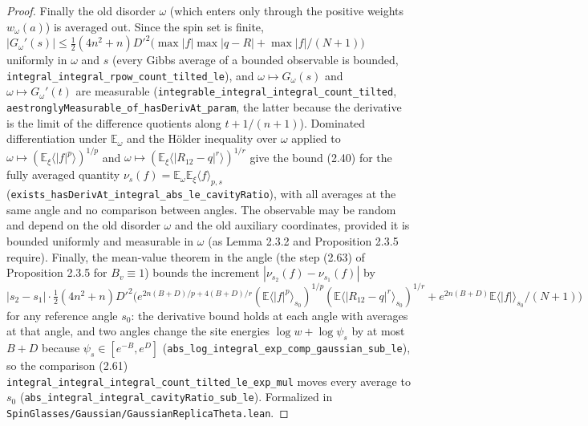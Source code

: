 \begin{proof}
Finally the old disorder $\omega$ (which enters only through the positive weights $w_\omega(a)$) is averaged out. Since the spin set is finite, $|G_\omega'(s)|\le\tfrac12(4n^2+n)D'^2\bigl(\max|f|\max|q-R|+\max|f|/(N+1)\bigr)$ uniformly in $\omega$ and $s$ (every Gibbs average of a bounded observable is bounded, \texttt{integral\_integral\_rpow\_count\_tilted\_le}), and $\omega\mapsto G_\omega(s)$ and $\omega\mapsto G_\omega'(t)$ are measurable (\texttt{integrable\_integral\_integral\_count\_tilted}, \texttt{aestronglyMeasurable\_of\_hasDerivAt\_param}, the latter because the derivative is the limit of the difference quotients along $t+1/(n+1)$). Dominated differentiation under $\mathbb E_\omega$ and the H\"older inequality over $\omega$ applied to $\omega\mapsto(\mathbb E_\xi\langle|f|^p\rangle)^{1/p}$ and $\omega\mapsto(\mathbb E_\xi\langle|R_{12}-q|^r\rangle)^{1/r}$ give the bound (2.40) for the fully averaged quantity $\nu_s(f)=\mathbb E_\omega\mathbb E_\xi\langle f\rangle_{p,s}$ (\texttt{exists\_hasDerivAt\_integral\_abs\_le\_cavityRatio}), with all averages at the same angle and no comparison between angles.
The observable may be random and depend on the old disorder $\omega$ and the old auxiliary coordinates, provided it is bounded uniformly and measurable in $\omega$ (as Lemma 2.3.2 and Proposition 2.3.5 require). Finally, the mean-value theorem in the angle (the step (2.63) of Proposition 2.3.5 for $B_v\equiv1$) bounds the increment $|\nu_{s_2}(f)-\nu_{s_1}(f)|$ by $|s_2-s_1|\cdot\tfrac12(4n^2+n)D'^2\bigl(e^{2n(B+D)/p+4(B+D)/r}(\mathbb E\langle|f|^p\rangle_{s_0})^{1/p}(\mathbb E\langle|R_{12}-q|^r\rangle_{s_0})^{1/r}+e^{2n(B+D)}\mathbb E\langle|f|\rangle_{s_0}/(N+1)\bigr)$ for any reference angle $s_0$: the derivative bound holds at each angle with averages at that angle, and two angles change the site energies $\log w+\log\psi_s$ by at most $B+D$ because $\psi_s\in[e^{-B},e^D]$ (\texttt{abs\_log\_integral\_exp\_comp\_gaussian\_sub\_le}), so the comparison (2.61) \texttt{integral\_integral\_integral\_count\_tilted\_le\_exp\_mul} moves every average to $s_0$ (\texttt{abs\_integral\_integral\_cavityRatio\_sub\_le}).
Formalized in \texttt{SpinGlasses/Gaussian/GaussianReplicaTheta.lean}.
\end{proof}

